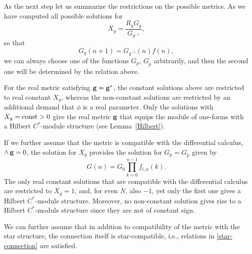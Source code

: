 \documentclass[pdftex]{sigma}
\numberwithin{equation}{section}
\newcommand{\ip}{{\tilde{p}}}
\begin{document}
As the next step let us summarize the restrictions on the possible metrics. As we have computed all possible solutions for
\[ X_g = \frac{R_g G_g}{G_{g^{-1}}},\]
so that
\[ G_g(n+1) = G_{g^{-1}}(n) f(n),\]
we can always choose one of the functions $G_p$, $G_{\ip}$ arbitrarily, and then the second one will be determined by the relation above.

\begin{Remark}\label{remark_Hilbert}For the real metric satisfying ${\bf g}={\bf g}^\ast$, the constant solutions above are restricted to real constant $X_g$, whereas the non-constant solutions are restricted by an additional demand that $\phi$ is a real parameter. Only the solutions with $X_g={\rm const} > 0$ give the real metric ${\bf g}$ that equips the module of one-forms with a Hilbert $C^\ast$-module structure (see Lemma~\ref{Hilbert}).
\end{Remark}

\begin{Remark}If we further assume that the metric is compatible with the differential calculus, $\wedge\,{\bf g}=0$, the solution for $X_g$ provides the solution for $G_p=G_\ip$ given by
\[ G(n) = G_0 \prod_{k=0}^{n-1} f_{l,\phi}(k). \]
The only real constant solutions that are compatible with the differential calculus are restricted to $X_g=1$, and, for even $N$, also $-1$, yet only the first one gives a Hilbert $C^\ast$-module structure. Moreover, no non-constant solution gives rise to a Hilbert $C^\ast$-module structure since they are not of constant sign.
\end{Remark}

We can further assume that in addition to compatibility of the metric with the star structure, the connection itself is star-compatible, i.e., relations in \eqref{star-connection} are satisfied.
\end{document}
